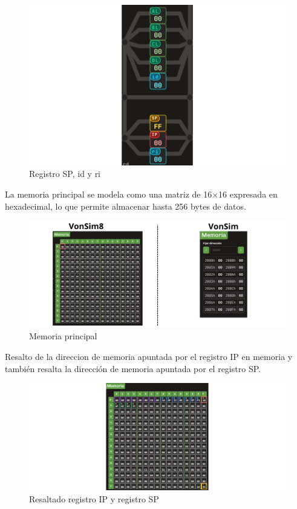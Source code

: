 \documentclass[12pt,oneside]{templates/unerthesis}
\begin{document}
\begin{figure}

{\centering \includegraphics[width=0.85\linewidth]{images/idrisp} 

}

\caption{Registro SP, id y ri}\label{fig:idrisp}
\end{figure}

La memoria principal se modela como una matriz de 16×16 expresada en hexadecimal, lo que permite almacenar hasta 256 bytes de datos.

\begin{figure}

{\centering \includegraphics[width=0.85\linewidth]{images/memoriacomp} 

}

\caption{Memoria principal}\label{fig:memoriacomp}
\end{figure}

Resalto de la direccion de memoria apuntada por el registro IP en memoria y también resalta la dirección de memoria apuntada por el registro SP.

\begin{figure}

{\centering \includegraphics[width=0.85\linewidth]{images/resaltadoipsp} 

}

\caption{Resaltado registro IP y registro SP}\label{fig:resaltadoip}
\end{figure}
\end{document}
